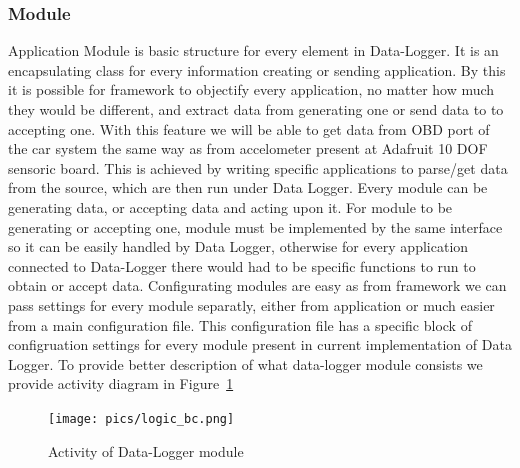 \subsubsection{Module}
\label{ssub:module}
Application Module is basic structure for every element in Data-Logger. It is an encapsulating class for every information creating or sending application. By this it is possible for framework to objectify every application, no matter how much they would be different, and extract data from generating one or send data to to accepting one. With this feature we will be able to get data from OBD port of the car system the same way as from accelometer present at Adafruit 10 DOF sensoric board. This is achieved by writing specific applications to parse/get data from the source, which are then run under Data Logger. Every module can be generating data, or accepting data and acting upon it. For module to be generating or accepting one, module must be implemented by the same interface so it can be easily handled by Data Logger, otherwise for every application connected to Data-Logger there would had to be specific functions to run to obtain or accept data. Configurating modules are easy as from framework we can pass settings for every module separatly, either from application or much easier from a main configuration file. This configuration file has a specific block of configruation settings for every module present in current implementation of Data Logger. To provide better description of what data-logger module consists we provide activity diagram in Figure~\ref{fig:activity}
\begin{figure}[H]
\begin{center}
\captionsetup{font=small}
\texttt{[image: pics/logic\_bc.png]}
\caption{Activity of Data-Logger module}
\label{fig:activity}
\end{center}
\end{figure}
